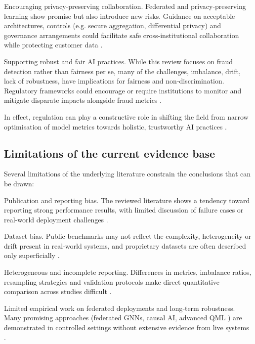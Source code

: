 \documentclass[a4paper,fleqn]{cas-dc}
\begin{document}
Encouraging privacy‑preserving collaboration. 
Federated and privacy‑preserving learning show promise but also introduce new risks. 
Guidance on acceptable architectures, controls (e.g. secure aggregation, differential privacy) and governance arrangements could facilitate safe cross‑institutional collaboration while protecting customer data \cite{zhang_optimization_2025, ferreira_when_2021, li_fedgat-dcnn_2024}.

Supporting robust and fair AI practices. 
While this review focuses on fraud detection rather than fairness per se, many of the challenges, imbalance, drift, lack of robustness, have implications for fairness and non‑discrimination. 
Regulatory frameworks could encourage or require institutions to monitor and mitigate disparate impacts alongside fraud metrics \cite{parkar_comparative_2024, sarna_ai_2025}.

In effect, regulation can play a constructive role in shifting the field from narrow optimisation of model metrics towards holistic, trustworthy AI practices \cite{mill_opportunities_2023, chen_deep_2025}.

\subsection{Limitations of the current evidence base}
Several limitations of the underlying literature constrain the conclusions that can be drawn:

Publication and reporting bias.
The reviewed literature shows a tendency toward reporting strong performance results, with limited discussion of failure cases or real-world deployment challenges \cite{chen_deep_2025, cherif_credit_2023}.

Dataset bias. 
Public benchmarks may not reflect the complexity, heterogeneity or drift present in real‑world systems, and proprietary datasets are often described only superficially \cite{adil_optdevnet_2024, ranganatha_enhancing_2025, ferreira_when_2021}.

Heterogeneous and incomplete reporting. 
Differences in metrics, imbalance ratios, resampling strategies and validation protocols make direct quantitative comparison across studies difficult \cite{cherif_credit_2023, leevy_threshold_2023, chen_deep_2025}.

Limited empirical work on federated deployments and long‑term robustness. 
Many promising approaches (federated GNNs, causal AI, advanced QML \cite{wang_integrating_2022}) are demonstrated in controlled settings without extensive evidence from live systems \cite{huot_quantum_2024, innan_financial_2024}.
\end{document}
